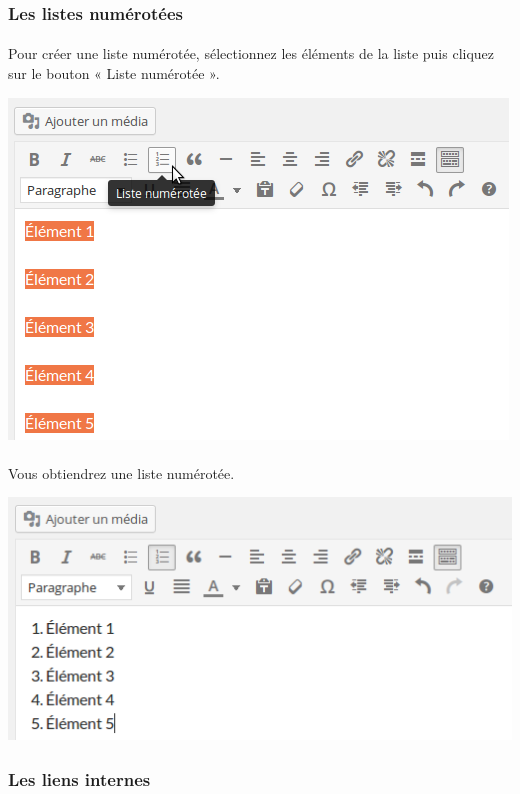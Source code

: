 \documentclass[10pt,a4paper]{article}
\begin{document}
\subsubsection{Les listes numérotées}
\paragraph{}Pour créer une liste numérotée, sélectionnez les éléments de la liste puis cliquez sur le bouton « Liste numérotée ».
\begin{center}
\includegraphics[scale=0.35]{img/0075.png}
\end{center}
\paragraph{}Vous obtiendrez une liste numérotée.
\begin{center}
\includegraphics[scale=0.35]{img/0076.png}
\end{center}
\subsubsection{Les liens internes}
\end{document}
